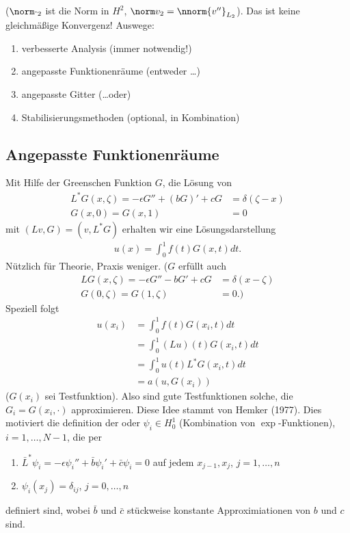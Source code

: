($\norm \cdot_{2}$ ist die Norm in $H^2$, $\norm v_{2} = \nnorm {v''}_{L_{2}}$). 
Das ist keine gleichmäßige Konvergenz! Auswege:
\begin{enumerate}
\item verbesserte Analysis (immer notwendig!)
\item angepasste Funktionenräume (entweder \dots)
\item angepasste Gitter (\dots oder)
\item Stabilisierungsmethoden (optional, in Kombination)
\end{enumerate}

\subsection{Angepasste Funktionenräume}
\label{sec:angep-funkt}

Mit Hilfe der Greenschen Funktion $G$, die Lösung von
\begin{align*}
  L^{*}G(x, \zeta) = - \epsilon G'' + (bG)' + cG &= \delta(\zeta-x)\\
  G(x, 0) = G(x, 1) &= 0
\end{align*}
mit $(Lv, G) = (v, L^{*}G)$ erhalten wir eine Lösungsdarstellung
\begin{align*}
  u(x) = \int_{0}^{1}f(t) G(x, t)dt. 
\end{align*}
Nützlich für Theorie, Praxis weniger. 
 ($G$ erfüllt auch
\begin{align*}
  LG(x, \zeta) = - \epsilon G'' - bG' + cG &= \delta(x - \zeta)\\
G(0, \zeta) = G(1, \zeta) &= 0. )
\end{align*}
Speziell folgt
\begin{align*}
  u(x_{i}) &= \int_{0}^{1}f(t) G(x_{i}, t)dt\\
  &= \int_{0}^{1}(Lu)(t) G(x_{i}, t) dt\\
  &= \int_{0}^{1}u(t) L^{*}G(x_{i}, t) dt\\
  &= a (u, G(x_{i}))
\end{align*}
($G(x_{i})$ sei Testfunktion). 
Also sind gute Testfunktionen solche, die $G_{i} = G(x_{i}, \cdot)$ approximieren. Diese Idee stammt von Hemker (1977).  Dies motiviert die definition der  oder  $\psi_{i} \in H_{0}^{1}$ (Kombination von $\exp$-Funktionen), $i= 1, \dots, N-1$, die per
\begin{enumerate}
\item $\bar L^{*} \psi_{i} = - \epsilon \psi_{i}'' + \bar b \psi_{i}' + \bar c \psi_{i} = 0$
auf jedem $x_{j-1}, x_{j}$, $j = 1, \dots, n$
\item $\psi_{i}(x_{j}) = \delta_{ij}$, $j = 0, \dots, n$
\end{enumerate}
definiert sind, wobei $\bar b$ und $\bar c$ stückweise konstante Approximiationen von $b$ und $c$ sind. 

